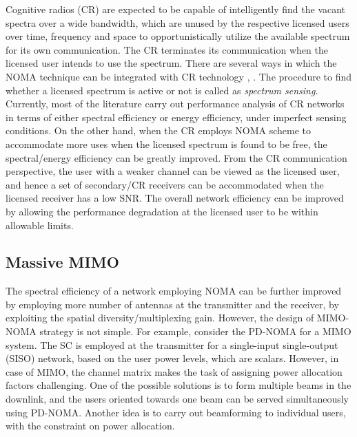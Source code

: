 \begin{multicols}{2}
Cognitive radios (CR) are expected to be capable of intelligently find the vacant spectra over a wide bandwidth, which are unused by the respective licensed users over time, frequency and space to opportunistically utilize the available spectrum for its own communication. The CR terminates its communication when the licensed user intends to use the spectrum. There are several ways in which the NOMA technique can be integrated with CR technology \cite{Lv_ComMag_2018}, \cite{Yu_Access_2019}. The procedure to find whether a licensed spectrum is active or not is called as \emph{spectrum sensing}. Currently, most of the literature carry out performance analysis of CR networks in terms of either spectral efficiency or energy efficiency, under imperfect sensing conditions. On the other hand, when the CR employs NOMA scheme to accommodate more uses when the licensed spectrum is found to be free, the spectral/energy efficiency can be greatly improved. From the CR communication perspective, the user with a weaker channel can be viewed as the licensed user, and hence a set of secondary/CR receivers can be accommodated when the licensed receiver has a low SNR. The overall network efficiency can be improved by allowing the performance degradation at the licensed user to be within allowable limits.

\subsection{Massive MIMO}
The spectral efficiency of a network employing NOMA can be further improved by employing more number of antennas at the transmitter and the receiver, by exploiting the spatial diversity/multiplexing gain. However, the design of MIMO-NOMA strategy is not simple. For example, consider the PD-NOMA for a MIMO system. The SC is employed at the transmitter for a single-input single-output (SISO) network, based on the user power levels, which are scalars. However, in case of MIMO, the channel matrix makes the task of assigning power allocation factors challenging. One of the possible solutions is to form multiple beams in the downlink, and the users oriented towards one beam can be served simultaneously using PD-NOMA. Another idea is to carry out beamforming to individual users, with the constraint on power allocation.


\end{multicols}
